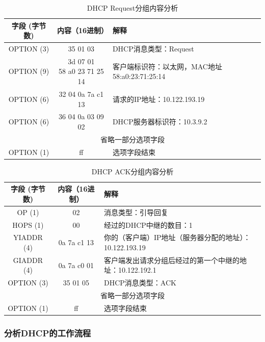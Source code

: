 \documentclass[lang=cn,11pt,a4paper,cite=authornum]{paper}
\begin{document}
\begin{table}[!htbp]
    \centering
    \caption{DHCP Request分组内容分析\label{tab:dhcp3res}}
    \begin{tabular}{|c|c|l|}
        \hline
        字段 (字节数) & 内容（16进制） & 解释 \\
        \hline
        OPTION (3) & 35 01 03 & DHCP消息类型：Request \\
        \hline
        OPTION (9) & \makecell[c]{3d 07 01 \\ 58 a0 23 71 25 14} & 客户端标识符：以太网，MAC地址58:a0:23:71:25:14 \\
        \hline
        OPTION (6) & 32 04 0a 7a c1 13 & 请求的IP地址：10.122.193.19 \\
        \hline
        OPTION (6) & 36 04 0a 03 09 02 & DHCP服务器标识符：10.3.9.2 \\
        \hline
        \multicolumn{3}{|c|}{省略一部分选项字段} \\ 
        \hline
        OPTION (1) & ff & 选项字段结束 \\
        \hline
    \end{tabular}
\end{table}

\begin{table}[!htbp]
    \centering
    \caption{DHCP ACK分组内容分析\label{tab:dhcp4res}}
    \begin{tabular}{|c|c|l|}
        \hline
        字段 (字节数) & 内容（16进制） & 解释 \\
        \hline
        OP (1) & 02 & 消息类型：引导回复 \\
        \hline
        HOPS (1) & 00 & 经过的DHCP中继的数目：1 \\
        \hline
        YIADDR (4) & 0a 7a c1 13 & 你的（客户端）IP地址（服务器分配的地址）：10.122.193.19 \\
        \hline
        GIADDR (4) & 0a 7a c0 01 & 客户端发出请求分组后经过的第一个中继的地址：10.122.192.1 \\
        \hline
        OPTION (3) & 35 01 05 & DHCP消息类型：ACK \\
        \hline
        \multicolumn{3}{|c|}{省略一部分选项字段} \\ 
        \hline
        OPTION (1) & ff & 选项字段结束 \\
        \hline
    \end{tabular}
\end{table}

\subsubsection{分析DHCP的工作流程}
\end{document}
